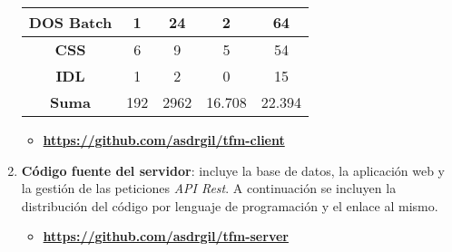 \begin{enumerate}
\begin{table}[!htbp]
\begin{tabular}{|c|c|c|c|c|}
        \textbf{DOS Batch}          & 1                 & 24                                                                  & 2                                                                        & 64                                                                  \\ \hline
        \textbf{CSS}                & 6                 & 9                                                                   & 5                                                                        & 54                                                                  \\ \hline
        \textbf{IDL}                & 1                 & 2                                                                   & 0                                                                        & 15                                                                  \\ \hline
        \textbf{Suma}               & 192               & 2962                                                                & 16.708                                                                   & 22.394                                                              \\ \hline
        \end{tabular}
    \end{table}
    
    \begin{itemize}
        \item \textbf{\href{https://github.com/asdrgil/tfm-client}{https://github.com/asdrgil/tfm-client}}
    \end{itemize}
    
    \break
    
    \item \textbf{Código fuente del servidor}: incluye la base de datos, la aplicación web y la gestión de las peticiones \textit{API Rest}. A continuación se incluyen la distribución del código por lenguaje de programación y el enlace al mismo.
    \begin{itemize}
        \item \textbf{\href{https://github.com/asdrgil/tfm-server}{https://github.com/asdrgil/tfm-server}}
    \end{itemize}
    

\end{enumerate}
